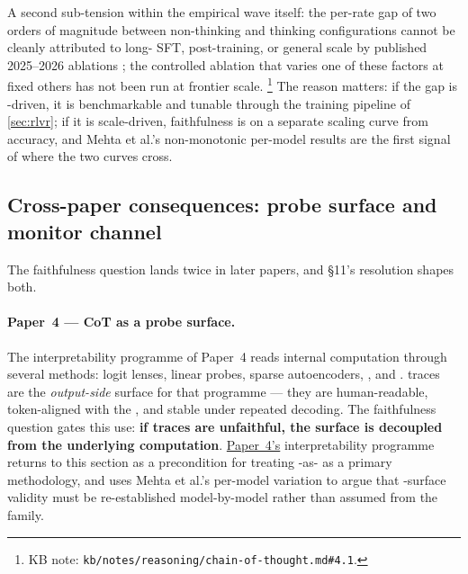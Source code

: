 A second sub-tension within the empirical wave itself: the per-rate
gap of two orders of magnitude between non-thinking and thinking
configurations \citep[abstract]{arcuschin2025-cot-wild} cannot be
cleanly attributed to long- SFT,  post-training, or general
scale by published 2025--2026 ablations
\citep[\S 4]{mehta2026-faithfulness-scaling}; the controlled
ablation that varies one of these factors at fixed others has not been
run at frontier scale.%
\footnote{KB note:
\nolinkurl{kb/notes/reasoning/chain-of-thought.md#4.1}.} The reason
matters: if the gap is -driven, it is benchmarkable and tunable
through the training pipeline of \cref{sec:rlvr}; if it is scale-driven,
faithfulness is on a separate scaling curve from accuracy, and Mehta et
al.'s non-monotonic per-model results are the first signal of where the
two curves cross.

\subsection{Cross-paper consequences: probe surface and monitor channel}
\label{sec:faith-cross-paper}

The faithfulness question lands twice in later papers, and §11's
resolution shapes both.

\paragraph{Paper~4 — CoT as a probe surface.}
The interpretability programme of Paper~4 reads internal computation
through several methods: logit lenses, linear probes, sparse
autoencoders, , and .  traces are
the \emph{output-side}  surface for that programme — they are
human-readable, token-aligned with the , and stable
under repeated decoding. The faithfulness question gates this use:
\textbf{if traces are unfaithful, the  surface is decoupled from
the underlying computation}. \hyperref[P4-sec:introduction]{Paper~4's} interpretability programme returns to
this section as a precondition for treating -as- as a primary
methodology, and uses Mehta et al.'s per-model variation to argue that
-surface validity must be re-established model-by-model rather
than assumed from the family.

